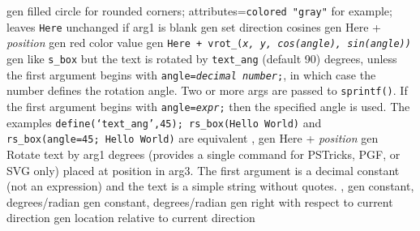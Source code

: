   {gen}%
  {filled circle for rounded corners; attributes={\tt colored "gray"}
   for example; leaves {\tt Here} unchanged if arg1 is blank
    }%
%
  {gen}%
  {set direction cosines}%
%
  {gen}%
  {Here + {\sl position}}%
%
  {gen}%
  {red color value}%
%
  {gen}%
  {\tt Here + vrot\_({\sl x, y, cos(angle), sin(angle))}}%
%
  {gen}%
  {like {\tt s\_box} but the text is rotated by {\tt text\_ang}%
   (default 90) degrees, unless
   the first argument begins with {\tt angle={\sl decimal number};},
   in which case the number defines the rotation angle.
   Two or more args are passed to {\tt sprintf()}.
   If the first argument begins with {\tt angle={\sl expr};} then
   the specified angle is used.
   The examples {\tt define(`text\_ang',45); rs\_box(Hello World)} and
   {\tt rs\_box(angle=45; Hello World)} are equivalent
   , }%
%
  {gen}%
  {Here + {\sl position}}%
%
  {gen}%
  {Rotate text by arg1 degrees (provides a single command for
   PSTricks, PGF, or SVG only) placed at position in arg3.
   The first argument is a decimal constant (not an expression) and
   the text is a simple string without quotes.
   , }%
%
  {gen}%
  {constant, degrees/radian}%
%
  {gen}%
  {constant, degrees/radian}%
%
  {gen}%
  {right with respect to current direction}%
%
  {gen}%
  {location relative to current direction}%

%

